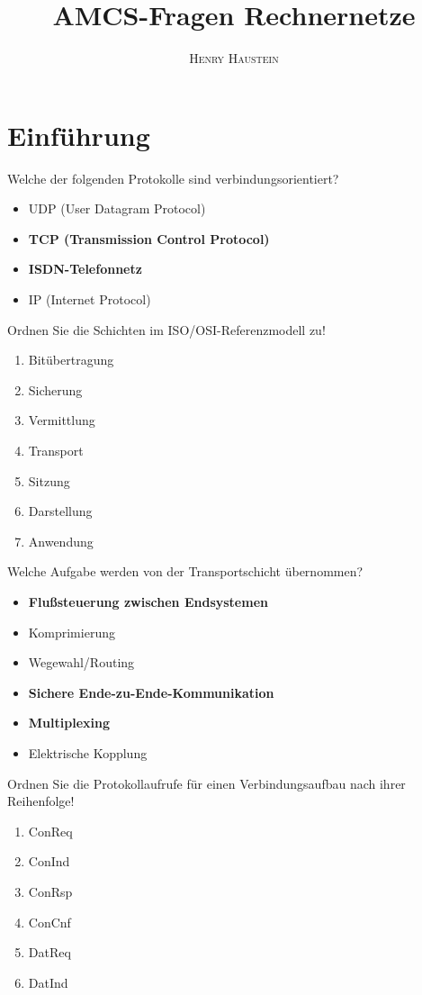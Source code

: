 \documentclass{article}
\title{\textbf{AMCS-Fragen Rechnernetze}}
\author{\textsc{Henry Haustein}}
\date{}
\begin{document}
	\maketitle
	
	\section{Einführung}
	
	Welche der folgenden Protokolle sind verbindungsorientiert? 
	\begin{itemize}
		\item UDP (User Datagram Protocol)
		\item \textbf{TCP (Transmission Control Protocol)}
		\item \textbf{ISDN-Telefonnetz}
		\item IP (Internet Protocol)
	\end{itemize}

	Ordnen Sie die Schichten im ISO/OSI-Referenzmodell zu!
	\begin{enumerate}
		\item Bitübertragung
		\item Sicherung
		\item Vermittlung
		\item Transport
		\item Sitzung
		\item Darstellung
		\item Anwendung
	\end{enumerate}
	
	Welche Aufgabe werden von der Transportschicht übernommen?
	\begin{itemize}
		\item \textbf{Flußsteuerung zwischen Endsystemen}
		\item Komprimierung
		\item Wegewahl/Routing
		\item \textbf{Sichere Ende-zu-Ende-Kommunikation}
		\item \textbf{Multiplexing}
		\item Elektrische Kopplung
	\end{itemize}

	Ordnen Sie die Protokollaufrufe für einen Verbindungsaufbau nach ihrer Reihenfolge! 
	\begin{enumerate}
		\item ConReq
		\item ConInd
		\item ConRsp
		\item ConCnf
		\item DatReq
		\item DatInd
	\end{enumerate}
\end{document}
